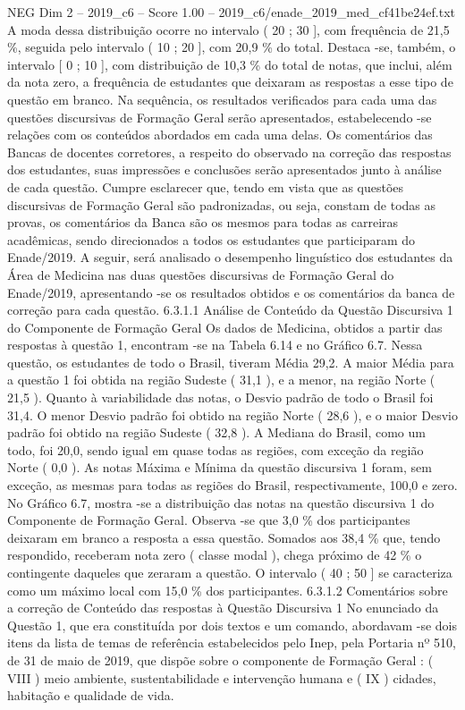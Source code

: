 \begin{textsample}{NEG Dim 2 – 2019\_c6 – Score 1.00 – 2019\_c6/enade\_2019\_med\_cf41be24ef.txt}
A moda dessa distribuição ocorre no intervalo ( 20 ; 30 ], com frequência de 21,5 \%, seguida pelo intervalo ( 10 ; 20 ], com 20,9 \% do total.
Destaca -se, também, o intervalo [ 0 ; 10 ], com distribuição de 10,3 \% do total de notas, que inclui, além da nota zero, a frequência de estudantes que deixaram as respostas a esse tipo de questão em branco.
Na sequência, os resultados verificados para cada uma das questões discursivas de Formação Geral serão apresentados, estabelecendo -se relações com os conteúdos abordados em cada uma delas.
Os comentários das Bancas de docentes corretores, a respeito do observado na correção das respostas dos estudantes, suas impressões e conclusões serão apresentados junto à análise de cada questão.
Cumpre esclarecer que, tendo em vista que as questões discursivas de Formação Geral são padronizadas, ou seja, constam de todas as provas, os comentários da Banca são os mesmos para todas as carreiras acadêmicas, sendo direcionados a todos os estudantes que participaram do Enade/2019.
A seguir, será analisado o desempenho linguístico dos estudantes da Área de Medicina nas duas questões discursivas de Formação Geral do Enade/2019, apresentando -se os resultados obtidos e os comentários da banca de correção para cada questão. 6.3.1.1 Análise de Conteúdo da Questão Discursiva 1 do Componente de Formação Geral Os dados de Medicina, obtidos a partir das respostas à questão 1, encontram -se na Tabela 6.14 e no Gráfico 6.7.
Nessa questão, os estudantes de todo o Brasil, tiveram Média 29,2.
A maior Média para a questão 1 foi obtida na região Sudeste ( 31,1 ), e a menor, na região Norte ( 21,5 ).
Quanto à variabilidade das notas, o Desvio padrão de todo o Brasil foi 31,4.
O menor Desvio padrão foi obtido na região Norte ( 28,6 ), e o maior Desvio padrão foi obtido na região Sudeste ( 32,8 ).
A Mediana do Brasil, como um todo, foi 20,0, sendo igual em quase todas as regiões, com exceção da região Norte ( 0,0 ).
As notas Máxima e Mínima da questão discursiva 1 foram, sem exceção, as mesmas para todas as regiões do Brasil, respectivamente, 100,0 e zero.
No Gráfico 6.7, mostra -se a distribuição das notas na questão discursiva 1 do Componente de Formação Geral.
Observa -se que 3,0 \% dos participantes deixaram em branco a resposta a essa questão.
Somados aos 38,4 \% que, tendo respondido, receberam nota zero ( classe modal ), chega próximo de 42 \% o contingente daqueles que zeraram a questão.
O intervalo ( 40 ; 50 ] se caracteriza como um máximo local com 15,0 \% dos participantes. 6.3.1.2 Comentários sobre a correção de Conteúdo das respostas à Questão Discursiva 1 No enunciado da Questão 1, que era constituída por dois textos e um comando, abordavam -se dois itens da lista de temas de referência estabelecidos pelo Inep, pela Portaria nº 510, de 31 de maio de 2019, que dispõe sobre o componente de Formação Geral : ( VIII ) meio ambiente, sustentabilidade e intervenção humana e ( IX ) cidades, habitação e qualidade de vida.

\end{textsample}

